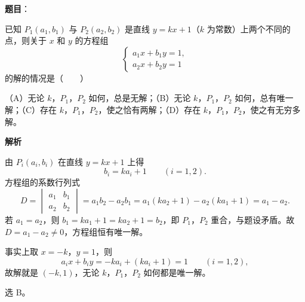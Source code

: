 \begin{answer}

\textbf{题目}：

已知 $P_1(a_1,b_1)$ 与 $P_2(a_2,b_2)$ 是直线 $y=kx+1$（$k$ 为常数）上两个不同的点，则关于 $x$ 和 $y$ 的方程组
\nopagebreak[4]
\[\begin{cases}
a_1x+b_1y=1,\\
a_2x+b_2y=1
\end{cases}\]
的解的情况是\mbox{（　　）}

（A）无论 $k$，$P_1$，$P_2$ 如何，总是无解；（B）无论 $k$，$P_1$，$P_2$ 如何，总有唯一解；（C）存在 $k$，$P_1$，$P_2$，使之恰有两解；（D）存在 $k$，$P_1$，$P_2$，使之有无穷多解。

\textbf{解析}

由 $P_i(a_i,b_i)$ 在直线 $y=kx+1$ 上得
\nopagebreak[4]
\[b_i=ka_i+1\qquad(i=1,2).\]
方程组的系数行列式
\nopagebreak[4]
\[D=\begin{vmatrix}a_1&b_1\\a_2&b_2\end{vmatrix}=a_1b_2-a_2b_1=a_1(ka_2+1)-a_2(ka_1+1)=a_1-a_2 .\]
若 $a_1=a_2$，则 $b_1=ka_1+1=ka_2+1=b_2$，即 $P_1$，$P_2$ 重合，与题设矛盾。故 $D=a_1-a_2\neq0$，方程组恒有唯一解。

事实上取 $x=-k$，$y=1$，则
\nopagebreak[4]
\[a_ix+b_iy=-ka_i+(ka_i+1)=1\qquad(i=1,2),\]
故解就是 $(-k,1)$，无论 $k$，$P_1$，$P_2$ 如何都是唯一解。

选 B。


\end{answer}
